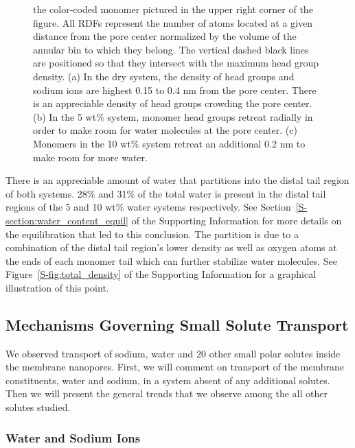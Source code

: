 \documentclass[journal=jpcbfk,manuscript=article]{achemso}
\begin{document}
\begin{figure}[!htb]
{  the color-coded monomer pictured in the upper right corner of the figure. 
  All RDFs represent the number of atoms located at a given distance from the
  pore center normalized by the volume of the annular bin to which they belong.
  The vertical dashed black lines are positioned so that they intersect with 
  the maximum head group density.
  (a) In the dry system, the density of head groups and sodium ions are highest
  0.15 to 0.4 nm from the pore center. There is an appreciable density of head groups
  crowding the pore center. (b) In the 5 wt\% system, monomer head 
  groups retreat radially in order to make room for water molecules at the pore center.
  (c) Monomers in the 10 wt\% system retreat an additional 0.2 nm to make room
  for more water.}\label{fig:component_densities}
  \end{figure}
  
  There is an appreciable amount of water that partitions into the distal tail %
  region of both systems. 28\% and 31\% of the total water is present in the
  distal tail regions of the 5 and 10 wt\% water systems respectively. See 
  Section~\ref{S-section:water_content_equil} of the Supporting Information 
  for more details on the equilibration that led to this conclusion. The partition
  is due to a combination of the distal tail region's lower density as well
  as oxygen atoms at the ends of each monomer tail which can further stabilize
  water molecules. See Figure~\ref{S-fig:total_density} of the Supporting 
  Information for a graphical illustration of this point.

  \subsection{Mechanisms Governing Small Solute Transport}\label{section:mechanism_overview} 

  We observed transport of sodium, water and 20 other small polar solutes
  inside the membrane nanopores. First, we will comment on transport of the
  membrane constituents, water and sodium, in a system absent of any additional
  solutes. Then we will present the general trends that we observe among the
  all other solutes studied.
  
  \subsubsection{Water and Sodium Ions}\label{section:transport_water_sodium} 
\end{document}
